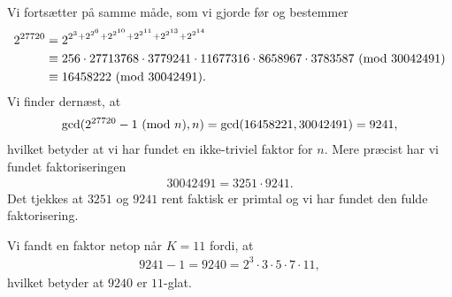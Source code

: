 \begin{example}
Vi fortsætter på samme måde, som vi gjorde før og bestemmer
\begin{align*}
	2^{27720} &= 2^{2^3 + 2^{2^6} + 2^{2^{10}} + 2^{2^{11}} + 2^{2^{13}} + 2^{2^{14}}} \\
	&\equiv 256 \cdot 27713768 \cdot 3779241 \cdot 11677316 \cdot 8658967 \cdot 3783587 \ (\mathrm{mod} \ 30042491) \\
	&\equiv 16458222 \ (\mathrm{mod} \ 30042491).
\end{align*}
Vi finder dernæst, at
\begin{align*}
	\gcd(2^{27720} - 1 \ (\mathrm{mod} \ n), n) = \gcd(16458221, 30042491) = 9241,
\end{align*}
hvilket betyder at vi har fundet en ikke-triviel faktor for $n$. Mere præcist har vi fundet faktoriseringen
\begin{align*}
	30042491 = 3251 \cdot 9241.
\end{align*}
Det tjekkes at $3251$ og $9241$ rent faktisk er primtal og vi har fundet den fulde faktorisering.
\end{example}
\begin{remark}
Vi fandt en faktor netop når $K=11$ fordi, at 
\begin{align*}
	9241 - 1 = 9240 = 2^3 \cdot 3 \cdot 5 \cdot 7 \cdot 11,
\end{align*}
hvilket betyder at $9240$ er $11$-glat.
\end{remark}